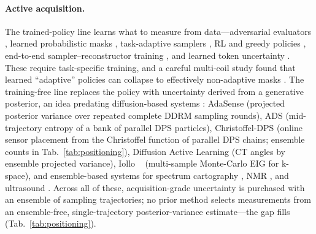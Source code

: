 \paragraph{Active acquisition.}
The trained-policy line learns what to measure from data---adversarial
evaluators \cite{zhang2019active}, learned probabilistic masks
\cite{bahadir2019loupe}, task-adaptive samplers
\cite{huijben2020dps,vangorp2021adps}, RL and greedy policies
\cite{pineda2020rl,bakker2020greedy}, end-to-end sampler--reconstructor
training \cite{yin2021seqmri}, and learned token uncertainty
\cite{ayzenberg2026token}. These require task-specific training, and a careful
multi-coil study found that learned ``adaptive'' policies can collapse to
effectively non-adaptive masks \cite{bakker2022multicoil}. The training-free
line replaces the policy with uncertainty derived from a generative posterior,
an idea predating diffusion-based systems \cite{vandecamp2023eig}: AdaSense
\cite{elata2024adasense} (projected posterior variance over repeated complete
DDRM sampling rounds), ADS \cite{nolan2025ads} (mid-trajectory entropy of a
bank of parallel DPS particles), Christoffel-DPS \cite{christoffel2026dps}
(online sensor placement from the Christoffel function of parallel DPS
chains; ensemble counts in Tab.~\ref{tab:positioning}), Diffusion Active
Learning \cite{barba2025dal} (CT angles by ensemble projected variance),
Iollo \etal~\cite{iollo2025bedmri} (multi-sample Monte-Carlo EIG for
k-space), and ensemble-based systems for spectrum cartography
\cite{gu2025gsc}, NMR \cite{goffinet2025diffnmr}, and ultrasound
\cite{vannierop2025cognitive}. Across all of these, acquisition-grade
uncertainty is purchased with an ensemble of sampling trajectories; no prior
method selects measurements from an ensemble-free, single-trajectory
posterior-variance estimate---the gap \pvas{} fills
(Tab.~\ref{tab:positioning}).

